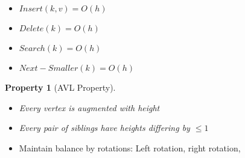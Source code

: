 \documentclass[11pt]{scrartcl}
\theoremstyle{dotlessP}
\newtheorem{property}[theorem]{Property}
\theoremstyle{dotlessN}
\begin{document}
\begin{itemize}
	\item $Insert(k,v) = O(h)$
	\item $Delete(k) = O(h)$
	\item $Search(k) = O(h)$ \\
	\item $Next-Smaller(k) = O(h)$
\end{itemize}
\begin{property}
	[AVL Property]
	\begin{itemize}
		\item Every vertex is augmented with height 
		\item Every pair of siblings have heights differing by $\leq 1$
	\end{itemize}
\end{property}
\begin{itemize}
	\item Maintain balance by rotations: Left rotation, right rotation,
\end{itemize}
\end{document}
